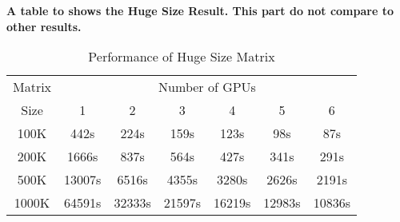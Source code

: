 \textbf{A table to shows the Huge Size Result. This part do not compare to other results.} 

\begin{table}[h]
\caption{Performance of Huge Size Matrix}
\centering
\begin{tabular}{|c|c|c|c|c|c|c|}
\hline
Matrix & \multicolumn{6}{|c|}{Number of GPUs} \\ \cline{2-7}
Size & 1 & 2 & 3 & 4 & 5 & 6 \\ \hline
100K   &   442s  &   224s  &   159s  &   123s  &    98s  &    87s\\ \hline
200K   &  1666s  &   837s  &   564s  &   427s  &   341s  &   291s\\ \hline
500K   & 13007s  &  6516s  &  4355s  &  3280s  &  2626s  &  2191s\\ \hline
1000K  & 64591s  & 32333s  & 21597s  & 16219s  & 12983s  & 10836s\\ \hline
\end{tabular}
\label{tab:hresult}
\end{table}

